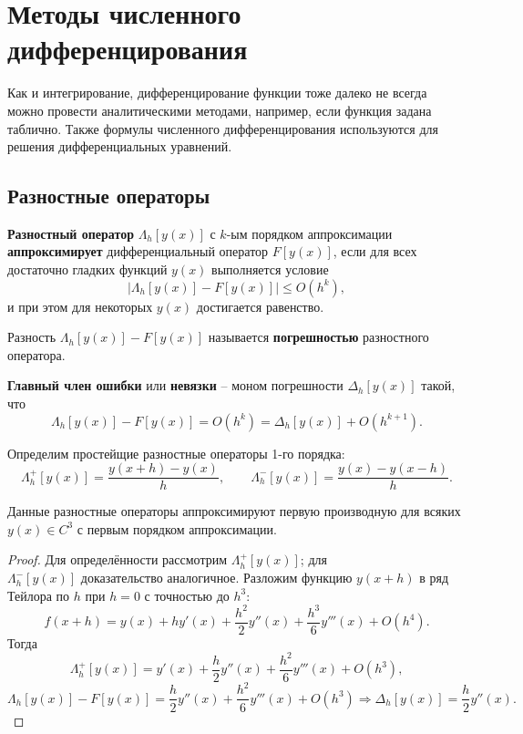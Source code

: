 \documentclass[../main.tex]{subfile}
\begin{document}
\section{Методы численного дифференцирования}
Как и интегрирование, дифференцирование функции тоже далеко не всегда можно
провести аналитическими методами, например, если функция задана таблично. Также
формулы численного дифференцирования используются для решения дифференциальных
уравнений.

\subsection{Разностные операторы}
\begin{define}\label{eq:difference_operator}
	\textbf{Разностный оператор} $\Lambda_h[y(x)]$ с $k$-ым порядком
	аппроксимации \textbf{аппроксимирует} дифференциальный оператор
	$F[y(x)]$, если для всех достаточно гладких функций $y(x)$ выполняется
	условие
	\[\big|\Lambda_h[y(x)]-F[y(x)]\big|\le O(h^k),\]
	и при этом для некоторых $y(x)$ достигается равенство.
\end{define}

\begin{define}
	Разность $\Lambda_h[y(x)]-F[y(x)]$ называется \textbf{погрешностью}
	разностного оператора.
\end{define}

\begin{define}
	\textbf{Главный член ошибки} или \textbf{невязки} -- моном погрешности
	$\Delta_h[y(x)]$ такой, что
	\[\Lambda_h[y(x)]-F[y(x)]=O(h^k)=\Delta_h[y(x)]+O(h^{k+1}).\]
\end{define}

\begin{define} \label{eq:simpliest_difference_operators}
	Определим простейщие разностные операторы 1-го порядка:
	\[\Lambda_h^+[y(x)]=\frac{y(x+h)-y(x)}{h},\qquad
	\Lambda_h^-[y(x)]=\frac{y(x)-y(x-h)}{h}.\]
\end{define}
\newpage

\begin{lemma}
	Данные разностные операторы аппроксимируют первую производную для всяких
	$y(x)\in C^3$ с первым порядком аппроксимации.
\end{lemma}

\begin{proof}
	Для определённости рассмотрим $\Lambda_h^+[y(x)]$; для \\
	$\Lambda_h^-[y(x)]$ доказательство аналогичное. Разложим функцию
	$y(x+h)$ в ряд Тейлора по $h$ при $h=0$ с точностью до $h^3$:
	\[f(x+h)=y(x)+hy'(x)+\frac{h^2}{2}y''(x)+\frac{h^3}{6}y'''(x)
	+O(h^4).\]
	Тогда
	\[\Lambda_h^+[y(x)]=y'(x)+\frac{h}{2}y''(x)+\frac{h^2}{6}
	y'''(x)+O(h^3),\]
	\[\Lambda_h[y(x)]-F[y(x)]=\frac{h}{2}y''(x)+\frac
	{h^2}{6}y'''(x)+O(h^3)\Rightarrow \Delta_h[y(x)]=\frac{h}{2}y''(x).\]
\end{proof}
\end{document}
